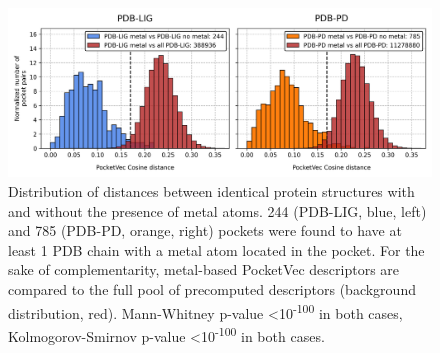 \begin{figure}[htbp]
  \centering
  \includegraphics[width=0.9\linewidth]{figures/PocketVec/Supplementary/FigS25.png}
  \caption{
  Distribution of distances between identical protein structures with and without the presence of metal atoms. 244 (PDB-LIG, blue, left) and 785 (PDB-PD, orange, right) pockets were found to have at least 1 PDB chain with a metal atom located in the pocket. For the sake of complementarity, metal-based PocketVec descriptors are compared to the full pool of precomputed descriptors (background distribution, red). Mann-Whitney p-value <10\textsuperscript{-100} in both cases, Kolmogorov-Smirnov p-value <10\textsuperscript{-100} in both cases.
  }
  \label{PocketVec_FigS25}
\end{figure}



